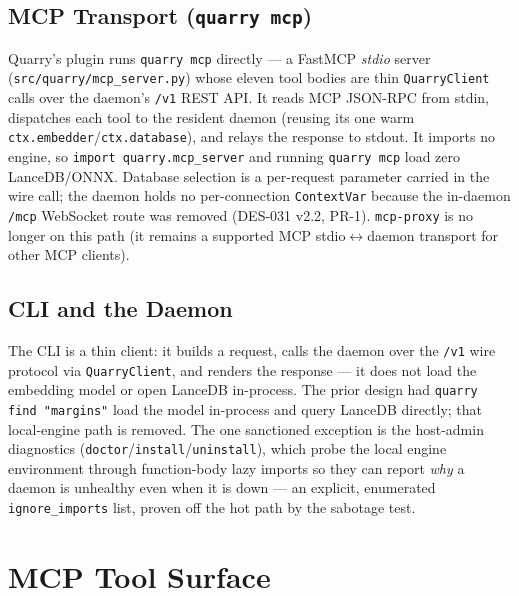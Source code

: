 \documentclass[a4paper,10pt]{article}
\newcommand{\modpath}[1]{\texttt{src/quarry/#1}}
\begin{document}
\subsection{MCP Transport (\texttt{quarry mcp})}

Quarry's plugin runs \texttt{quarry mcp} directly --- a FastMCP
\emph{stdio} server (\modpath{mcp\_server.py}) whose eleven tool bodies
are thin \texttt{QuarryClient} calls over the daemon's \texttt{/v1} REST
API.  It reads MCP JSON-RPC from stdin, dispatches each tool to the
resident daemon (reusing its one warm \texttt{ctx.embedder}/\texttt{ctx.database}),
and relays the response to stdout.  It imports no engine, so
\texttt{import quarry.mcp\_server} and running \texttt{quarry mcp} load
zero LanceDB/ONNX.  Database selection is a per-request parameter carried
in the wire call; the daemon holds no per-connection \texttt{ContextVar}
because the in-daemon \texttt{/mcp} WebSocket route was removed (DES-031
v2.2, PR-1).  \texttt{mcp-proxy} is no longer on this path (it remains a
supported MCP stdio$\leftrightarrow$daemon transport for other MCP clients).

\subsection{CLI and the Daemon}

The CLI is a thin client: it builds a request, calls the daemon over the
\texttt{/v1} wire protocol via \texttt{QuarryClient}, and renders the
response --- it does not load the embedding model or open LanceDB
in-process.  The prior design had \texttt{quarry find "margins"} load the
model in-process and query LanceDB directly; that local-engine path is
removed.  The one sanctioned exception is the host-admin diagnostics
(\texttt{doctor}/\texttt{install}/\texttt{uninstall}), which probe the
local engine environment through function-body lazy imports so they can
report \emph{why} a daemon is unhealthy even when it is down --- an
explicit, enumerated \texttt{ignore\_imports} list, proven off the hot
path by the sabotage test.

\section{MCP Tool Surface}
\end{document}
